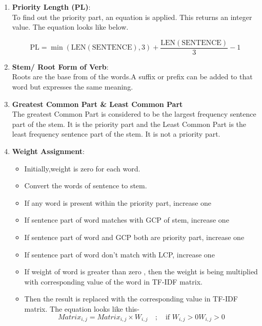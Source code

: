 \documentclass[a4paper,12pt]{article}
\begin{document}
\begin{enumerate}
\item \textbf{Priority Length (PL)}: \\
    To find out the priority part, an equation is applied. This returns an integer value. The equation looks like below.
    
    \begin{equation}
        \text{PL} = \min(\text{LEN}(\text{SENTENCE}), 3) + \frac{\text{LEN}(\text{SENTENCE})}{3} - 1
    \end{equation}
   
    \item \textbf{Stem/ Root Form of Verb}:\\
    Roots are the base from of the words.A suffix or prefix can be added to that word but expresses the same meaning.
    \item \textbf{Greatest Common Part \& Least Common Part}\\
   The greatest Common Part is considered to be the largest frequency sentence part of the stem. It is the priority part and the Least Common Part is the least frequency sentence part of the stem. It is not a priority part.
   \newpage
    \item \textbf{Weight Assignment}:
    \begin{itemize}
        \item Initially,weight is zero for each word.
        \item Convert the words of sentence to stem.
        \item If any word is present within the priority part, increase one
        \item If sentence part of word matches with GCP of stem, increase one
        \item If sentence part of word and GCP both are priority part, increase one
        \item If sentence part of word don’t match with LCP, increase one
        \item If weight of word is greater than zero , then the weight is being multiplied  with corresponding value of the word in TF-IDF matrix.
        \item Then the result is replaced with the corresponding value in TF-IDF matrix. The equation looks like this-\\
        \begin{equation}
       Matrix_{i,j} = Matrix_{i,j} \times W_{i,j} \quad ; \quad \text{if } W_{i,j} > 0 W_{i,j} > 0
        \end{equation}

\end{itemize}
\end{enumerate}
\end{document}
